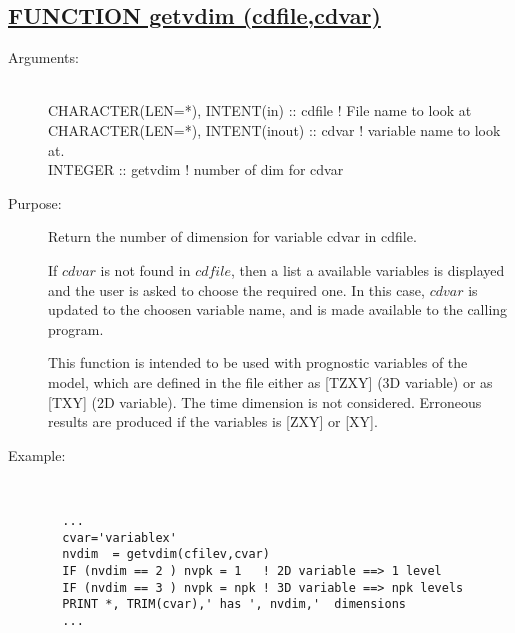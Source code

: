 \documentclass[a4paper,11pt]{article}
\begin{document}
\subsection*{\underline{FUNCTION getvdim (cdfile,cdvar)  }}
\begin{description}
\item[Arguments:] \ \\
    CHARACTER(LEN=*), INTENT(in)    :: cdfile   ! File name to look at \\
    CHARACTER(LEN=*), INTENT(inout) :: cdvar    ! variable name to look at. \\
    INTEGER :: getvdim                          ! number of dim for cdvar \\
\item[Purpose:]   Return the number of dimension for variable cdvar in cdfile.

If $cdvar$ is not found in $cdfile$, then a list a available variables is displayed and the
user is asked to choose the required one. In this case, $cdvar$ is updated to the choosen
variable name, and is made available to the calling program.

This function is intended to be used with prognostic variables of the model, which are
defined in the file either as [TZXY] (3D variable) or as [TXY] (2D variable). The time
dimension is not considered. Erroneous results are produced if the variables is [ZXY] or [XY].

\item[Example:]\ 
\begin{verbatim}
  ...
  cvar='variablex'
  nvdim  = getvdim(cfilev,cvar)
  IF (nvdim == 2 ) nvpk = 1   ! 2D variable ==> 1 level
  IF (nvdim == 3 ) nvpk = npk ! 3D variable ==> npk levels
  PRINT *, TRIM(cvar),' has ', nvdim,'  dimensions
  ...
\end{verbatim}
\end{description}
\newpage
\end{document}
